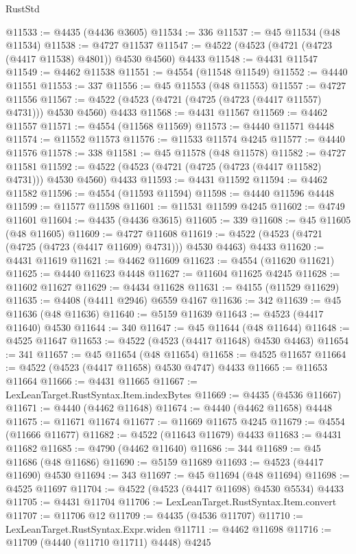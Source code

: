 \begin{lexlean}{RustStd}
\begin{coremodule}
@11533 := @4435 (@4436 @3605)
@11534 := 336
@11537 := @45 @11534 (@48 @11534)
@11538 := @4727 @11537
@11547 := @4522 (@4523 (@4721 (@4723 (@4417 @11538) @4801)) @4530 @4560) @4433
@11548 := @4431 @11547
@11549 := @4462 @11538
@11551 := @4554 (@11548 @11549)
@11552 := @4440 @11551
@11553 := 337
@11556 := @45 @11553 (@48 @11553)
@11557 := @4727 @11556
@11567 := @4522 (@4523 (@4721 (@4725 (@4723 (@4417 @11557) @4731))) @4530 @4560) @4433
@11568 := @4431 @11567
@11569 := @4462 @11557
@11571 := @4554 (@11568 @11569)
@11573 := @4440 @11571 @4448
@11574 := @11552 @11573
@11576 := @11533 @11574 @4245
@11577 := @4440 @11576
@11578 := 338
@11581 := @45 @11578 (@48 @11578)
@11582 := @4727 @11581
@11592 := @4522 (@4523 (@4721 (@4725 (@4723 (@4417 @11582) @4731))) @4530 @4560) @4433
@11593 := @4431 @11592
@11594 := @4462 @11582
@11596 := @4554 (@11593 @11594)
@11598 := @4440 @11596 @4448
@11599 := @11577 @11598
@11601 := @11531 @11599 @4245
@11602 := @4749 @11601
@11604 := @4435 (@4436 @3615)
@11605 := 339
@11608 := @45 @11605 (@48 @11605)
@11609 := @4727 @11608
@11619 := @4522 (@4523 (@4721 (@4725 (@4723 (@4417 @11609) @4731))) @4530 @4463) @4433
@11620 := @4431 @11619
@11621 := @4462 @11609
@11623 := @4554 (@11620 @11621)
@11625 := @4440 @11623 @4448
@11627 := @11604 @11625 @4245
@11628 := @11602 @11627
@11629 := @4434 @11628
@11631 := @4155 (@11529 @11629)
@11635 := @4408 (@4411 @2946) @6559 @4167
@11636 := 342
@11639 := @45 @11636 (@48 @11636)
@11640 := @5159 @11639
@11643 := @4523 (@4417 @11640) @4530
@11644 := 340
@11647 := @45 @11644 (@48 @11644)
@11648 := @4525 @11647
@11653 := @4522 (@4523 (@4417 @11648) @4530 @4463)
@11654 := 341
@11657 := @45 @11654 (@48 @11654)
@11658 := @4525 @11657
@11664 := @4522 (@4523 (@4417 @11658) @4530 @4747) @4433
@11665 := @11653 @11664
@11666 := @4431 @11665
@11667 := LexLeanTarget.RustSyntax.Item.indexBytes
@11669 := @4435 (@4536 @11667)
@11671 := @4440 (@4462 @11648)
@11674 := @4440 (@4462 @11658) @4448
@11675 := @11671 @11674
@11677 := @11669 @11675 @4245
@11679 := @4554 (@11666 @11677)
@11682 := @4522 (@11643 @11679) @4433
@11683 := @4431 @11682
@11685 := @4790 (@4462 @11640)
@11686 := 344
@11689 := @45 @11686 (@48 @11686)
@11690 := @5159 @11689
@11693 := @4523 (@4417 @11690) @4530
@11694 := 343
@11697 := @45 @11694 (@48 @11694)
@11698 := @4525 @11697
@11704 := @4522 (@4523 (@4417 @11698) @4530 @5534) @4433
@11705 := @4431 @11704
@11706 := LexLeanTarget.RustSyntax.Item.convert
@11707 := @11706 @12
@11709 := @4435 (@4536 @11707)
@11710 := LexLeanTarget.RustSyntax.Expr.widen
@11711 := @4462 @11698
@11716 := @11709 (@4440 (@11710 @11711) @4448) @4245

\end{coremodule}
\end{lexlean}
